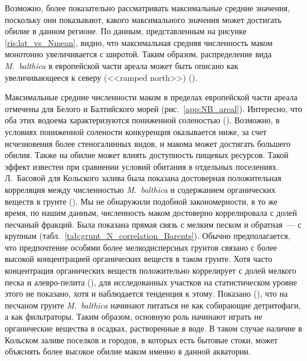 Возможно, более показательно рассматривать максимальные средние значения, поскольку они показывают, какого максимального значения может достигать обилие в данном регионе.
По данным, представленным на рисунке \ref{ris:lat_vs_Nmean}, видно, что максимальная средняя численность маком монотонно увеличивается с широтой.
Таким образом, распределение вида {\it M.~balthica} в европейской части ареала может быть описано как увеличивающееся к северу (<<ramped north>>) (\cite{Sagarin_Gaines_2002}).

Максимальные средние численности маком в пределах европейской части ареала отмечены для Белого и Балтийского морей (рис.~\ref{app:NB_areal}).
Интересно, что оба этих водоема характеризуются пониженной соленостью (\cite{Dobrovolskiy_Zalogin_1982}).
Возможно, в условиях пониженной солености конкуренция оказывается ниже, за счет исчезновения более стеногалинных видов, и макома может достигать большего обилия.
Также на обилие может влиять доступность пищевых ресурсов. 
Такой эффект известен при сравнении условий обитания в отдельных поселениях.
Л.~Басовой для Кольского залива была показана достоверная положительная корреляция между численностью {\it M.~balthica} и содержанием органических веществ в грунте (\cite{Basova_2004}).   
Мы не обнаружили подобной закономерности, в то же время, по нашим данным, численность маком достоверно коррелировала с долей песчаный фракций. 
Была показана прямая связь с мелким песком и обратная~--- с крупным (табл.~\ref{tab:grunt_N_correlation_Barents}).
Обычно предполагается, что предпочтение особями более мелкодисперсных грунтов связано с более высокой концентрацией органических веществ в таком грунте. 
Хотя часто концентрация органических веществ положительно коррелирует с долей мелкого песка и алевро-пелита (\cite{Bubnova_1972, Basova_2004}), для исследованных участков на статистическом уровне этого не показано, хотя и наблюдается тенденция к этому. 
Показано (\cite{Olafsson_1989}), что на песчаном грунте {\it M.~balthica} начинают питаться не как собирающие детритофаги, а как фильтраторы. 
Таким образом, основную роль начинают играть не органические вещества в осадках, растворенные в воде. 
В таком случае наличие в Кольском заливе поселков и городов, в которых есть бытовые стоки, может объяснять более высокое обилие маком именно в данной акватории.


